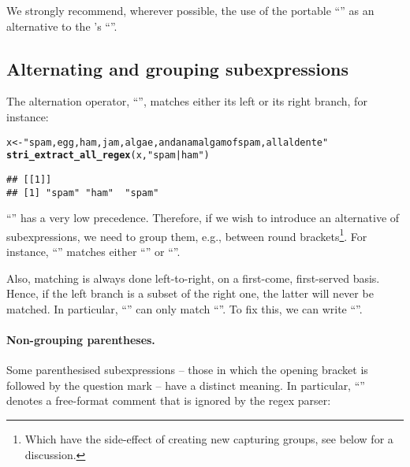 \documentclass[nojss]{jss}\usepackage[]{graphicx}\usepackage[]{xcolor}
\makeatletter
\newcommand{\hlstr}[1]{\textcolor[rgb]{0.192,0.494,0.8}{#1}}%
\newcommand{\hlstd}[1]{\textcolor[rgb]{0.345,0.345,0.345}{#1}}%
\newcommand{\hlkwb}[1]{\textcolor[rgb]{0.69,0.353,0.396}{#1}}%
\newcommand{\hlkwd}[1]{\textcolor[rgb]{0.737,0.353,0.396}{\textbf{#1}}}%
\newenvironment{kframe}{%
 \def\at@end@of@kframe{}%
 \ifinner\ifhmode%
  \def\at@end@of@kframe{\end{minipage}}%
  \begin{minipage}{\columnwidth}%
 \fi\fi%
 \def\FrameCommand##1{\hskip\@totalleftmargin \hskip-\fboxsep
 \colorbox{shadecolor}{##1}\hskip-\fboxsep
     \hskip-\linewidth \hskip-\@totalleftmargin \hskip\columnwidth}%
 \MakeFramed {\advance\hsize-\width
   \@totalleftmargin\z@ \linewidth\hsize
   \@setminipage}}%
 {\par\unskip\endMakeFramed%
 \at@end@of@kframe}
\newenvironment{knitrout}{}{} %
\makeatother
\begin{document}
We strongly recommend, wherever possible, the use of the portable
``''
as an alternative to the 's ``\code{[:punct:]}''.



\subsection{Alternating and grouping subexpressions}

The alternation operator, ``\code{|}'',
matches either its left or its right branch,
for instance:

\begin{knitrout}
\color{fgcolor}\begin{kframe}
\begin{alltt}
\hlstd{x} \hlkwb{<-} \hlstr{"spam, egg, ham, jam, algae, and an amalgam of spam, all al dente"}
\hlkwd{stri_extract_all_regex}\hlstd{(x,} \hlstr{"spam|ham"}\hlstd{)}
\end{alltt}
\begin{verbatim}
## [[1]]
## [1] "spam" "ham"  "spam"
\end{verbatim}
\end{kframe}
\end{knitrout}

``\code{|}'' has a very low precedence. Therefore, if we wish to
introduce an alternative of subexpressions,
we need to group them, e.g., between round brackets\footnote{Which have
the side-effect of creating new capturing groups, see below for a discussion.}.
For instance, ``'' matches either
``'' or ``''.

Also, matching is always done left-to-right, on a first-come, first-served basis.
Hence, if the left branch is a subset of the right one, the latter will
never be matched.
In particular, ``'' can only match ``''.
To fix this, we can write ``''.


\paragraph{Non-grouping parentheses.}
Some parenthesised subexpressions -- those in which the opening bracket is followed by the question mark -- have a distinct meaning.
In particular, ``'' denotes a free-format comment
that is ignored by the regex parser:
\end{document}
